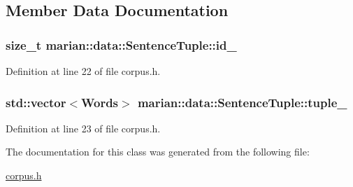 \subsection{Member Data Documentation}
\subsubsection[{\texorpdfstring{id\+\_\+}{id_}}]{\setlength{\rightskip}{0pt plus 5cm}size\+\_\+t marian\+::data\+::\+Sentence\+Tuple\+::id\+\_\+\hspace{0.3cm}{\ttfamily [private]}}\hypertarget{classmarian_1_1data_1_1SentenceTuple_a5a1ca69d489e8c68bc947775f309b652}{}\label{classmarian_1_1data_1_1SentenceTuple_a5a1ca69d489e8c68bc947775f309b652}


Definition at line 22 of file corpus.\+h.

\subsubsection[{\texorpdfstring{tuple\+\_\+}{tuple_}}]{\setlength{\rightskip}{0pt plus 5cm}std\+::vector$<${\bf Words}$>$ marian\+::data\+::\+Sentence\+Tuple\+::tuple\+\_\+\hspace{0.3cm}{\ttfamily [private]}}\hypertarget{classmarian_1_1data_1_1SentenceTuple_a65e31c60b29cd6f4e93f43aa94be6f70}{}\label{classmarian_1_1data_1_1SentenceTuple_a65e31c60b29cd6f4e93f43aa94be6f70}


Definition at line 23 of file corpus.\+h.



The documentation for this class was generated from the following file\+:\begin{DoxyCompactItemize}
\item 
\hyperlink{corpus_8h}{corpus.\+h}\end{DoxyCompactItemize}

